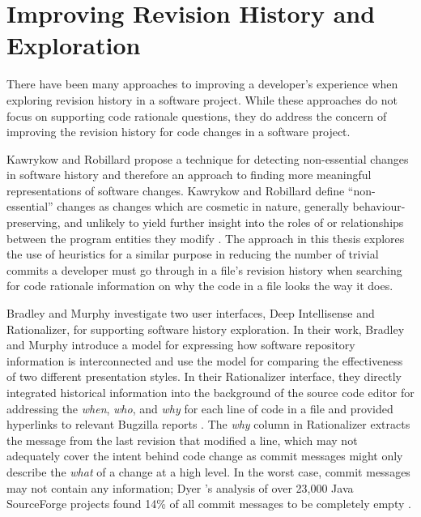 \section{Improving Revision History and Exploration}

There have been many approaches to improving a developer's experience when exploring revision history in a software project. While these approaches do not focus on supporting code rationale questions, they do address the concern of improving the revision history for code changes in a software project.

Kawrykow and Robillard \cite{kawrykow_non-essential_2011} propose a technique for detecting non-essential changes in software history and therefore an approach to finding more meaningful representations of software changes.
Kawrykow and Robillard define ``non-essential'' changes as changes which are cosmetic in nature, generally behaviour-preserving, and unlikely to yield further insight into the roles of or relationships between the program entities they modify \cite{kawrykow_non-essential_2011}. 
The approach in this thesis explores the use of heuristics for a similar purpose in reducing the number of trivial commits a developer must go through in a file's revision history when searching for code rationale information on why the code in a file looks the way it does.

Bradley and Murphy \cite{bradley_supporting_2011} investigate two user interfaces, Deep Intellisense and Rationalizer, for supporting software history exploration.
In their work, Bradley and Murphy introduce a model for expressing how software repository information is interconnected and use the model for comparing the effectiveness of two different presentation styles.
In their Rationalizer interface, they directly integrated historical information into the background of the source code editor for addressing the \emph{when}, \emph{who}, and \emph{why} for each line of code in a file and provided hyperlinks to relevant Bugzilla reports \cite{bradley_supporting_2011}.
The \emph{why} column in Rationalizer extracts the message from the last revision that modified a line, which may not adequately cover the intent behind code change as commit messages might only describe the \emph{what} of a change at a high level.
In the worst case, commit messages may not contain any information; Dyer \etal's analysis of over 23,000 Java SourceForge projects found 14\% of all commit messages to be completely empty \cite{dyer_boa_2013}.

